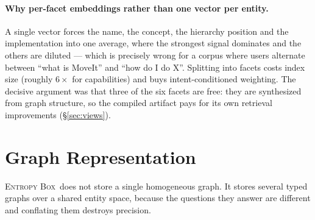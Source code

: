 \documentclass[10pt,a4paper]{article}
\newcommand{\eb}{\textsc{Entropy Box}\xspace}
\begin{document}
\paragraph{Why per-facet embeddings rather than one vector per entity.} A single
vector forces the name, the concept, the hierarchy position and the
implementation into one average, where the strongest signal dominates and the
others are diluted --- which is precisely wrong for a corpus where users
alternate between ``what is MoveIt'' and ``how do I do X''. Splitting into facets
costs index size (roughly $6\times$ for capabilities) and buys intent-conditioned
weighting. The decisive argument was that three of the six facets are free: they
are synthesized from graph structure, so the compiled artifact pays for its own
retrieval improvements (\S\ref{sec:views}).

\section{Graph Representation}
\label{sec:graph}

\eb\ does not store a single homogeneous graph. It stores several typed graphs
over a shared entity space, because the questions they answer are different and
conflating them destroys precision.
\end{document}
